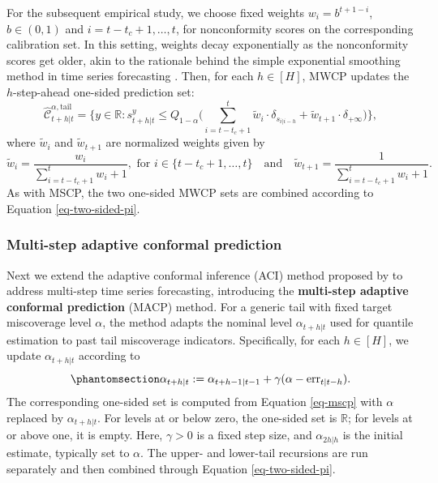 \documentclass[
  american,
  12pt]{article}
\theoremstyle{plain}
\theoremstyle{plain}
\theoremstyle{remark}
\begin{document}
For the subsequent empirical study, we choose fixed weights
\(w_i = b^{t+1-i}\), \(b \in (0, 1)\) and \(i=t-t_c+1, \dots, t\), for
nonconformity scores on the corresponding calibration set. In this
setting, weights decay exponentially as the nonconformity scores get
older, akin to the rationale behind the simple exponential smoothing
method in time series forecasting \citep{hyndman2021}. Then, for each
\(h \in [H]\), MWCP updates the \(h\)-step-ahead one-sided prediction
set: \[
\hat{\mathcal{C}}_{t+h|t}^{\alpha,\mathrm{tail}} = \Bigg\{y\in\mathbb{R}: s_{t+h|t}^{y} \leq Q_{1-\alpha}\Bigg(\sum_{i=t-t_c+1}^{t}\tilde{w}_i\cdot\delta_{s_{i|i-h}}+\tilde{w}_{t+1}\cdot\delta_{+\infty}\Bigg)\Bigg\},
\] where \(\tilde{w}_i\) and \(\tilde{w}_{t+1}\) are normalized weights
given by \[
\tilde{w}_i = \frac{w_i}{\sum_{i=t-t_c+1}^{t}w_i+1}, \text{ for } i \in \{t-t_c+1, \dots, t\} \quad \text{and} \quad \tilde{w}_{t+1} =  \frac{1}{\sum_{i=t-t_c+1}^{t}w_i+1}.
\] As with MSCP, the two one-sided MWCP sets are combined according to
Equation \eqref{eq-two-sided-pi}.

\subsubsection{Multi-step adaptive conformal
prediction}\label{multi-step-adaptive-conformal-prediction}

Next we extend the adaptive conformal inference (ACI) method proposed by
\citet{gibbs2021} to address multi-step time series forecasting,
introducing the \textbf{multi-step adaptive conformal prediction} (MACP)
method. For a generic tail with fixed target miscoverage level
\(\alpha\), the method adapts the nominal level \(\alpha_{t+h|t}\) used
for quantile estimation to past tail miscoverage indicators.
Specifically, for each \(h \in [H]\), we update \(\alpha_{t+h|t}\)
according to \begin{equation}\phantomsection\label{eq-macp}{
\alpha_{t+h|t} := \alpha_{t+h-1|t-1} + \gamma(\alpha - \mathrm{err}_{t|t-h}).
}\end{equation} The corresponding one-sided set is computed from
Equation \eqref{eq-mscp} with \(\alpha\) replaced by \(\alpha_{t+h|t}\).
For levels at or below zero, the one-sided set is \(\mathbb R\); for
levels at or above one, it is empty. Here, \(\gamma > 0\) is a fixed
step size, and \(\alpha_{2h|h}\) is the initial estimate, typically set
to \(\alpha\). The upper- and lower-tail recursions are run separately
and then combined through Equation \eqref{eq-two-sided-pi}.
\end{document}
